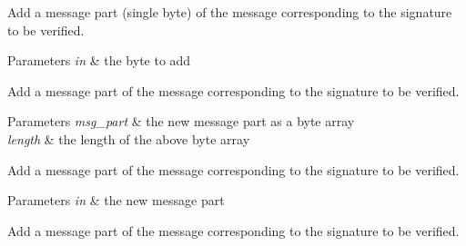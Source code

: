 Add a message part (single byte) of the message corresponding to the signature to be verified. 
\begin{DoxyParams}{Parameters}
{\em in} & the byte to add\\
\hline
\end{DoxyParams}
Add a message part of the message corresponding to the signature to be verified. 
\begin{DoxyParams}{Parameters}
{\em msg\+\_\+part} & the new message part as a byte array \\
\hline
{\em length} & the length of the above byte array\\
\hline
\end{DoxyParams}
Add a message part of the message corresponding to the signature to be verified. 
\begin{DoxyParams}{Parameters}
{\em in} & the new message part\\
\hline
\end{DoxyParams}
Add a message part of the message corresponding to the signature to be verified.

